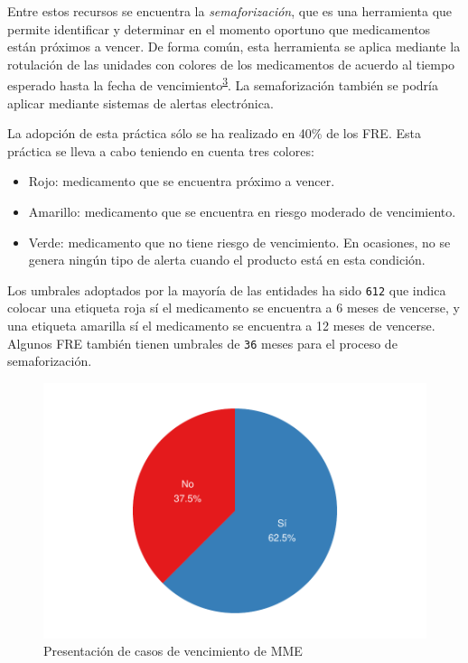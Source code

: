 \documentclass[
]{book}
\providecommand{\tightlist}{%
  \setlength{\itemsep}{0pt}\setlength{\parskip}{0pt}}
\begin{document}
Entre estos recursos se encuentra la \emph{semaforización}, que es una herramienta que permite identificar y determinar en el momento oportuno que medicamentos están próximos a vencer. De forma común, esta herramienta se aplica mediante la rotulación de las unidades con colores de los medicamentos de acuerdo al tiempo esperado hasta la fecha de vencimiento\textsuperscript{\protect\hyperlink{ref-HernandezVera2017}{3}}. La semaforización también se podría aplicar mediante sistemas de alertas electrónica.

La adopción de esta práctica sólo se ha realizado en 40\% de los FRE. Esta práctica se lleva a cabo teniendo en cuenta tres colores:

\begin{itemize}
\tightlist
\item
  Rojo: medicamento que se encuentra próximo a vencer.
\item
  Amarillo: medicamento que se encuentra en riesgo moderado de vencimiento.
\item
  Verde: medicamento que no tiene riesgo de vencimiento. En ocasiones, no se genera ningún tipo de alerta cuando el producto está en esta condición.
\end{itemize}

Los umbrales adoptados por la mayoría de las entidades ha sido \texttt{6\textbar{}12} que indica colocar una etiqueta roja sí el medicamento se encuentra a 6 meses de vencerse, y una etiqueta amarilla sí el medicamento se encuentra a 12 meses de vencerse. Algunos FRE también tienen umbrales de \texttt{3\textbar{}6} meses para el proceso de semaforización.

\begin{figure}
\includegraphics[width=0.85\linewidth]{InformeFinal_files/figure-latex/CasosVencimiento1-1} \caption{Presentación de casos de vencimiento de MME}\label{fig:CasosVencimiento1}
\end{figure}
\end{document}
